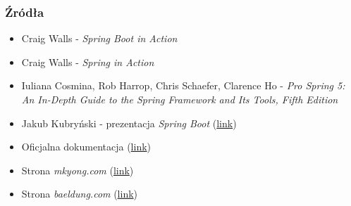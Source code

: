\documentclass{beamer}
\begin{document}
\begin{frame}
\frametitle{Źródła}
\begin{itemize}
\item Craig Walls - \textit{Spring Boot in Action}
\item Craig Walls - \textit{Spring in Action}
\item Iuliana Cosmina, Rob Harrop, Chris Schaefer, Clarence Ho - \textit{Pro Spring 5: An In-Depth Guide to the Spring Framework and Its Tools, Fifth Edition}
\item Jakub Kubryński - prezentacja \textit{Spring Boot} (\href{https://www.youtube.com/watch?v=zQll41ha5_g&feature=emb_title}{link})
\item Oficjalna dokumentacja (\href{https://docs.spring.io/spring-boot/docs/current/reference/html/spring-boot-features.html}{link})
\item Strona \textit{mkyong.com} (\href{https://mkyong.com/spring-boot/}{link})
\item Strona \textit{baeldung.com} (\href{https://www.baeldung.com/}{link})
\end{itemize}
\end{frame}
\end{document}
